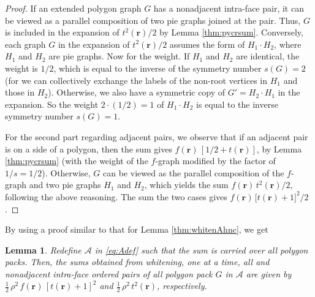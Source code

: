 \documentclass[preprint]{revtex4-1}
\newtheorem{lemm}[thrm]{Lemma}
\newcommand{\vct}[1]{\mathbf{#1}}
\providecommand{\vr}{} %
\renewcommand{\vr}{\vct{r}}
\newcommand{\A}{\mathcal{A}}
\begin{document}
\begin{proof}
If an extended polygon graph $G$ has a nonadjacent intra-face pair,
  it can be viewed as a parallel composition
  of two pie graphs joined at the pair.
%
Thus, $G$ is included in the expansion of $t^2(\vr)/2$
  by Lemma \ref{thm:pycrsum}.
%
Conversely,
  each graph $G$ in the expansion of $t^2(\vr)/2$
  assumes the form of $H_1 \cdot H_2$,
  where $H_1$ and $H_2$ are pie graphs.
%
Now for the weight.
%
If $H_1$ and $H_2$ are identical,
  the weight is $1/2$,
  which is equal to the inverse of
  the symmetry number $s(G) = 2$
  (for we can collectively exchange
  the labels of the non-root vertices in $H_1$
  and those in $H_2$).
%
Otherwise,
  we also have a symmetric copy of $G' = H_2 \cdot H_1$
  in the expansion.
So the weight $2\cdot(1/2) = 1$ of $H_1 \cdot H_2$
  is equal to the inverse symmetry number $s(G) = 1$.

For the second part regarding adjacent pairs,
  we observe that
  if an adjacent pair is on a side of a polygon,
  then the sum gives $f(\vr) \, [1/2 + t(\vr)]$,
  by Lemma \ref{thm:pycrsum}
  (with the weight of the $f$-graph
  modified by the factor of $1/s = 1/2$).
%
Otherwise,
  $G$ can be viewed as the parallel composition
  of the $f$-graph and two pie graphs $H_1$ and $H_2$,
%
which yields the sum $f(\vr) \, t^2(\vr)/2$,
  following the above reasoning.
%
The sum the two cases gives
  $f(\vr) \, \bigl[ t(\vr) + 1 \bigr]^2/2$.
\end{proof}



By using a proof similar to that for
Lemma \ref{thm:whitenAhnc},
we get

\begin{lemm}
Redefine $\A$ in \eqref{eq:Adef}
such that the sum is carried over all polygon packs.
Then, the sums obtained from whitening,
one at a time,
all and nonadjacent intra-face ordered pairs
of all polygon pack $G$ in $\A$
are given by
$\frac{1}{2} \, \rho^2 \, f(\vr) \, [t(\vr) + 1]^2$
and
$\frac{1}{2} \, \rho^2 \, t^2(\vr)$,
respectively.
\label{thm:whitenApy}
\end{lemm}
\end{document}

